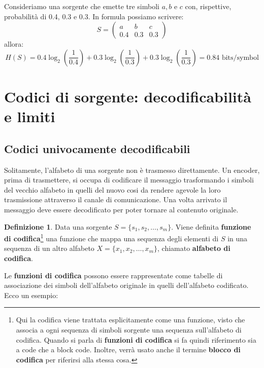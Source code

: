 \documentclass{article}
\theoremstyle{definition}
\newtheorem{definizione}{Definizione}[section]
\numberwithin{equation}{section}
\begin{document}
Consideriamo una sorgente che emette tre simboli $a,b \text{ e } c$ con, rispettive, probabilità di 0.4, 0.3 e 0.3. In formula possiamo scrivere:
\begin{equation*}
    S=\begin{pmatrix}
        a   & b   & c   \\
        0.4 & 0.3 & 0.3
    \end{pmatrix}
\end{equation*}
allora:
\begin{equation*}
    H(S)=0.4\log_2 \left(\frac{1}{0.4}\right)+0.3\log_2 \left(\frac{1}{0.3}\right)+0.3\log_2 \left(\frac{1}{0.3}\right)=0.84 \text{ bits/symbol}
\end{equation*}

\section{Codici di sorgente: decodificabilità e limiti}
\subsection{Codici univocamente decodificabili}
Solitamente, l'alfabeto di una sorgente non è trasmesso direttamente. Un encoder, prima di trasmettere, si occupa di codificare il messaggio trasformando i simboli del vecchio alfabeto in quelli del nuovo cosi da rendere agevole la loro trasmissione attraverso il canale di comunicazione. Una volta arrivato il messaggio deve essere decodificato per poter tornare al contenuto originale.
\begin{definizione}
    Data una sorgente $S = \{ s_1,s_2,\ldots,s_m\}$. Viene definita \textbf{funzione di codifica}\footnote{Qui la codifica viene trattata esplicitamente come una funzione, visto che associa a ogni sequenza di simboli sorgente una sequenza sull'alfabeto di codifica. Quando si parla di \textbf{funzioni di codifica} si fa quindi riferimento sia a code che a block code. Inoltre, verrà usato anche il termine \textbf{blocco di codifica} per riferirsi alla stessa cosa.} una funzione che mappa una sequenza degli elementi di $S$ in una sequenza di un altro alfabeto $X=\{ x_1,x_2,\ldots,x_m\}$, chiamato \textbf{alfabeto di codifica}.
\end{definizione}
Le \textbf{funzioni di codifica} possono essere rappresentate come tabelle di associazione dei simboli dell'alfabeto originale in quelli dell'alfabeto codificato. Ecco un esempio:
\end{document}
